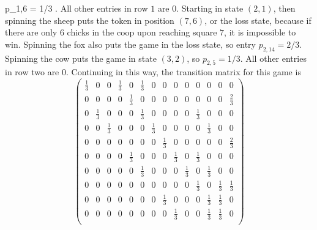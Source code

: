 \documentclass[12pt]{article}
\begin{document}
\begin{example}
    p_{1,6} = 1/3 \).  All other entries in row \( 1 \) are \( 0 \).
    Starting in state \( (2, 1) \), then spinning the sheep puts the
    token in position \( (7, 6) \), or the loss state, because if there
    are only \( 6 \) chicks in the coop upon reaching square \( 7 \), it
    is impossible to win.  Spinning the fox also puts the game in the
    loss state, so entry \( p_{2,14} = 2/3 \).  Spinning the cow puts
    the game in state \( (3, 2) \), so \( p_{2,5} = 1/3 \).  All other
    entries in row two are \( 0 \).  Continuing in this way, the
    transition matrix for this game is
    \[
        \begin{pmatrix}
            \frac{1}{3} & 0     & 0     & \frac{1}{3}   & 0     & \frac{1}
            {3} & 0     & 0     & 0     & 0     & 0     & 0     & 0
            & 0\\
            0   & 0     & 0     & 0     & \frac{1}{3}   & 0     & 0
            & 0 & 0     & 0     & 0     & 0     & 0     & \frac{2}{3}\\
            0   & \frac{1}{3}   & 0     & 0     & 0     & \frac{1}{3}
            & 0 & 0     & 0     & 0     & \frac{1}{3}   & 0     & 0
            & 0\\
            0   & 0     & \frac{1}{3}   & 0     & 0     & 0     & \frac{1}
            {3} & 0     & 0     & 0     & 0     & \frac{1}{3}   & 0
            & 0\\
            0   & 0     & 0     & 0     & 0     & 0     & 0     & \frac{1}
            {3} & 0     & 0     & 0     & 0     & 0     & \frac{2}{3}\\
            0   & 0     & 0     & 0     & \frac{1}{3}   & 0     & 0
            & 0 & \frac{1}{3}   & 0     & \frac{1}{3}   & 0     & 0
            & 0\\
            0   & 0     & 0     & 0     & 0     & \frac{1}{3}   & 0
            & 0 & 0     & \frac{1}{3}   & 0     & \frac{1}{3}   & 0
            & 0\\
            0   & 0     & 0     & 0     & 0     & 0     & 0     & 0
            & 0 & 0     & \frac{1}{3}   & 0     & \frac{1}{3}   & \frac{1}
            {3}\\
            0   & 0     & 0     & 0     & 0     & 0     & 0     & \frac{1}
            {3} & 0     & 0     & 0     & \frac{1}{3}   & \frac{1}{3}
            & 0\\
            0   & 0     & 0     & 0     & 0     & 0     & 0     & 0
            & \frac{1}{3}       & 0     & 0     & \frac{1}{3}   & \frac{1}
            {3} & 0\\

\end{pmatrix}\]
\end{example}
\end{document}
